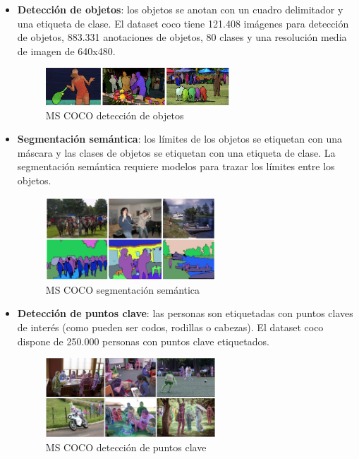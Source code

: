 \begin{itemize}
    \item \textbf{Detección de objetos}: los objetos se anotan con un cuadro delimitador y una etiqueta de clase. El dataset \gls{coco} tiene 121.408 imágenes para detección de objetos, 883.331 anotaciones de objetos, 80 clases y una resolución media de imagen de 640x480.
    
    \begin{figure}[ht]
    \centering
    \includegraphics[width=0.65\textwidth]{img/chapters/desarrollo/detection-splash.png}
    \caption{\label{fig:detection-splash}MS COCO detección de objetos \cite{coco-official-website}}
    \end{figure}
    
    \item \textbf{Segmentación semántica}: los límites de los objetos se etiquetan con una máscara y las clases de objetos se etiquetan con una etiqueta de clase. La segmentación semántica requiere modelos para trazar los límites entre los objetos.
    
    \begin{figure}[ht]
    \centering
    \includegraphics[width=0.6\textwidth]{img/chapters/desarrollo/panoptic-splash.png}
    \caption{\label{fig:panoptic-splash}MS COCO segmentación semántica \cite{coco-official-website}}
    \end{figure}    
    
    \item \textbf{Detección de puntos clave}: las personas son etiquetadas con puntos claves de interés (como pueden ser codos, rodillas o cabezas). El dataset \gls{coco} dispone de 250.000 personas con puntos clave etiquetados.
    
    \begin{figure}[ht]
    \centering
    \includegraphics[width=0.6\textwidth]{img/chapters/desarrollo/keypoints-splash-big.png}
    \caption{\label{fig:keypoints-splash-big}MS COCO detección de puntos clave \cite{coco-official-website}}
    \end{figure}    
    
\end{itemize}

